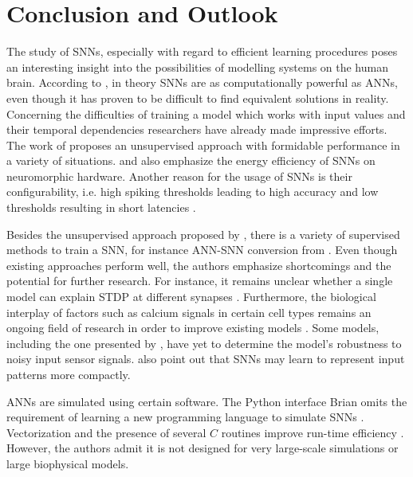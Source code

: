 \section{Conclusion and Outlook}
\label{sec:conclusion}

The study of \acp{SNN}, especially with regard to efficient learning procedures poses an interesting insight into the possibilities of modelling
systems on the human brain.
According to \authorsANNSNNconversion{} \cite{ANN_SNN_conversion}, in theory \acp{SNN} are as computationally powerful as \acp{ANN}, 
even though it has proven to be difficult to find equivalent solutions in reality.
Concerning the difficulties of training a model which works with input values and their temporal dependencies researchers have already made 
impressive efforts.
The work of \authorsSNN{} \cite{SNN} proposes an unsupervised approach with formidable performance in a variety of situations.
\authorsSNN{} \cite{SNN} and \authorsSynapticPlasticity{} \cite{Synaptic_plasticity} also emphasize the energy efficiency of \acp{SNN} on neuromorphic hardware.
Another reason for the usage of \acp{SNN} is their configurability, 
i.e. high spiking thresholds leading to high accuracy and low thresholds resulting in short latencies \cite{ANN_SNN_conversion}.

Besides the unsupervised approach proposed by \authorsSNN{} \cite{SNN}, there is a variety of supervised methods to train a \ac{SNN}, 
for instance \ac{ANN}-\ac{SNN} conversion from \authorsDIETSNN{} \cite{DIET_SNN}.
Even though existing approaches perform well, the authors emphasize shortcomings and the potential for further research.
For instance, it remains unclear whether a single model can explain \ac{STDP} at different synapses \cite{STDP_hebbian}.
Furthermore, the biological interplay of factors such as calcium signals in certain cell types remains an ongoing field of research 
in order to improve existing models \cite{STDP_hebbian}.
Some models, including the one presented by \authorsObjectDetectionSNN{} \cite{object_detection_SNN}, have yet to determine the model's robustness to noisy input sensor signals.
\authorsObjectDetectionSNN{} \cite{object_detection_SNN} also point out that \acp{SNN} may learn to represent input patterns more compactly.

\Acp{ANN} are simulated using certain software.
The Python interface Brian omits the requirement of learning a new programming language to simulate \acp{SNN} \cite{simulation_Brian}.
Vectorization and the presence of several $C$ routines improve run-time efficiency \cite{simulation_Brian}.
However, the authors admit it is not designed for very large-scale simulations or large biophysical models.


